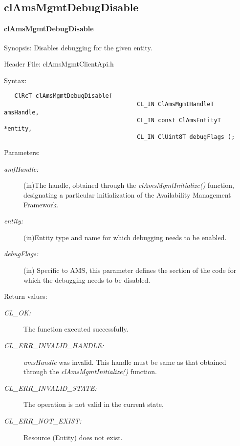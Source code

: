 \subsection{clAmsMgmtDebugDisable}
\hypertarget{pageams126}{}\paragraph{cl\-Ams\-Mgmt\-Debug\-Disable}\label{pageams126}
\begin{Desc}
\item[Synopsis:]Disables debugging for the given entity.\end{Desc}
\begin{Desc}
\item[Header File:]clAmsMgmtClientApi.h\end{Desc}
\begin{Desc}
\item[Syntax:]

\footnotesize\begin{verbatim}   ClRcT clAmsMgmtDebugDisable(
                              		  CL_IN ClAmsMgmtHandleT amsHandle,
                              		  CL_IN const ClAmsEntityT *entity,
                              		  CL_IN ClUint8T debugFlags );
\end{verbatim}
\normalsize
\end{Desc}
\begin{Desc}
\item[Parameters:]
\begin{description}
\item[{\em amf\-Handle:}](in)The handle, obtained through the \textit{clAmsMgmtInitialize()} function, designating a particular initialization of 
the Availability Management Framework. \item[{\em entity:}](in)Entity type and name for which debugging needs to be enabled. \item[{\em debug\-Flags:}](in)
Specific to AMS, this parameter defines the section of the code for which the debugging needs to be disabled.\end{description}
\end{Desc}
\begin{Desc}
\item[Return values:]
\begin{description}
\item[{\em CL\_\-OK:}]The function executed successfully. \item[{\em CL\_\-ERR\_\-INVALID\_\-HANDLE:}]{\em ams\-Handle\/} was invalid. 
This handle must be same as that obtained through the \textit{clAmsMgmtInitialize()} function. \item[{\em CL\_\-ERR\_\-INVALID\_\-STATE:}]The 
operation is not valid in the current state, \item[{\em CL\_\-ERR\_\-NOT\_\-EXIST:}]Resource (Entity) does not exist.\end{description}
\end{Desc}
